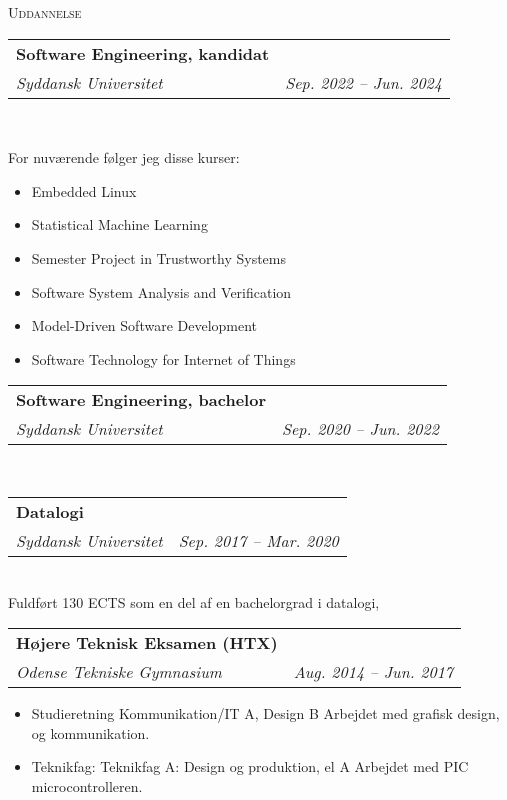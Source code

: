 \documentclass[11pt]{article}
\makeatletter
\newcommand{\resumeSubheading}[4]{
  \noindent\begin{tabular*}{0.98\textwidth}[t]{l@{\extracolsep{\fill}}r}
    \noindent \textbf{#3} & \textit{\small #2} \\ \vspace{-3pt} 
    \noindent \textit{\small #1} & \textit{\small #4} 
  \end{tabular*}\vspace{7pt}
}
\makeatother
\begin{document}
\vspace{0.3cm}
\noindent\large{\scshape{Uddannelse}} \newline
\noindent{\rule[0.3cm]{\textwidth}{0.4pt}}

\resumeSubheading{Syddansk Universitet}{}{Software Engineering, kandidat}{Sep.
2022 -- Jun. 2024}\\\vspace{0.25cm}
  \vspace{-0.3cm}
  {\indent\small 
  For nuværende følger jeg disse kurser: 
  \begin{itemize}
  \setlength{\itemsep}{-1pt}
    \item Embedded Linux
    \item Statistical Machine Learning
    \item Semester Project in Trustworthy Systems
    \item Software System Analysis and Verification
    \item Model-Driven Software Development
    \item Software Technology for Internet of Things
  \end{itemize}} 

\vspace{0.3cm}

\resumeSubheading{Syddansk Universitet}{}{Software Engineering, bachelor}{Sep.
2020 -- Jun. 2022}\\\vspace{0.25cm}

\resumeSubheading{Syddansk Universitet}{}{Datalogi}{Sep. 2017
-- Mar. 2020}\\\vspace{0.25cm} 
{\indent\small Fuldført 130 ECTS som en del af en bachelorgrad i datalogi,}
  
\vspace{0.3cm}

\resumeSubheading{Odense Tekniske Gymnasium}{}{Højere Teknisk Eksamen (HTX)}{Aug. 2014 -- Jun. 2017}
{\small \begin{itemize}\vspace{-0.25cm}
  \setlength{\itemsep}{-1pt}
  \item Studieretning Kommunikation/IT A, Design B
    \subitem Arbejdet med grafisk design, og kommunikation.
  \item Teknikfag: Teknikfag A: Design og produktion, el A
    \subitem\footnotesize Arbejdet med PIC microcontrolleren.
\end{itemize}
} \vspace{0.5cm}
\end{document}
